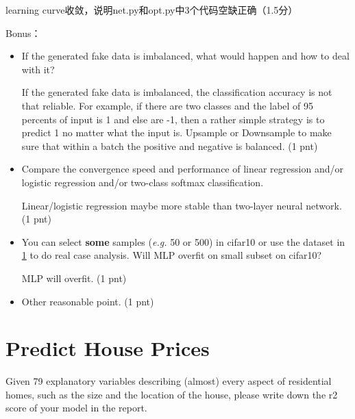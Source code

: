 \documentclass[12pt]{article}
\begin{document}
learning curve收敛，说明net.py和opt.py中3个代码空缺正确（1.5分）

Bonus：
\begin{itemize}
	\item If the generated fake data is imbalanced, what would happen and how to deal with it?

	      If the generated fake data is imbalanced, the classification accuracy is not that
	      reliable.  For example, if there are two classes and the label of
	      95 percents of input is 1 and else are -1, then a rather simple strategy is to
	      predict 1 no matter what  the input is.  Upsample or Downsample to make sure that within a batch the positive and negative is balanced.   (1 pnt)
	\item
	      Compare the convergence speed and performance of  linear regression and/or logistic regression and/or two-class softmax classification.

	      Linear/logistic regression maybe more stable than two-layer neural network. (1 pnt) 

	\item
	      You can select \textbf{some} samples (\textit{e.g.} 50 or 500) in cifar10 or use the dataset in {\ref{sec:4}} to do real case analysis. Will MLP overfit on small subset on cifar10?

		MLP will overfit.  (1 pnt)
	\item
	      Other reasonable point. (1 pnt)
\end{itemize}


\newpage
\section{Predict House Prices} \label{sec:4}
Given 79 explanatory variables describing (almost) every aspect of residential homes, such as the size  and the location of the house, please write down the r2 score of your model in the report.
\end{document}

